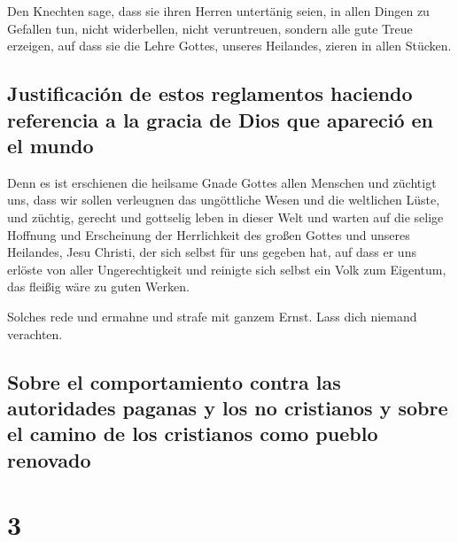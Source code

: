  Den Knechten sage, dass sie ihren Herren untertänig
seien, in allen Dingen zu Gefallen tun, nicht widerbellen,
 nicht veruntreuen, sondern alle gute Treue erzeigen, auf
dass sie die Lehre Gottes, unseres Heilandes, zieren in allen Stücken.

\hypertarget{justificaciuxf3n-de-estos-reglamentos-haciendo-referencia-a-la-gracia-de-dios-que-apareciuxf3-en-el-mundo}{%
\subsection{Justificación de estos reglamentos haciendo referencia a la
gracia de Dios que apareció en el
mundo}\label{justificaciuxf3n-de-estos-reglamentos-haciendo-referencia-a-la-gracia-de-dios-que-apareciuxf3-en-el-mundo}}

 Denn es ist erschienen die heilsame Gnade Gottes allen
Menschen  und züchtigt uns, dass wir sollen verleugnen
das ungöttliche Wesen und die weltlichen Lüste, und züchtig, gerecht und
gottselig leben in dieser Welt  und warten auf die selige
Hoffnung und Erscheinung der Herrlichkeit des großen Gottes und unseres
Heilandes, Jesu Christi,  der sich selbst für uns gegeben
hat, auf dass er uns erlöste von aller Ungerechtigkeit und reinigte sich
selbst ein Volk zum Eigentum, das fleißig wäre zu guten Werken.

 Solches rede und ermahne und strafe mit ganzem Ernst.
Lass dich niemand verachten.

\hypertarget{sobre-el-comportamiento-contra-las-autoridades-paganas-y-los-no-cristianos-y-sobre-el-camino-de-los-cristianos-como-pueblo-renovado}{%
\subsection{Sobre el comportamiento contra las autoridades paganas y los
no cristianos y sobre el camino de los cristianos como pueblo
renovado}\label{sobre-el-comportamiento-contra-las-autoridades-paganas-y-los-no-cristianos-y-sobre-el-camino-de-los-cristianos-como-pueblo-renovado}}

\hypertarget{section-2}{%
\section{3}\label{section-2}}

